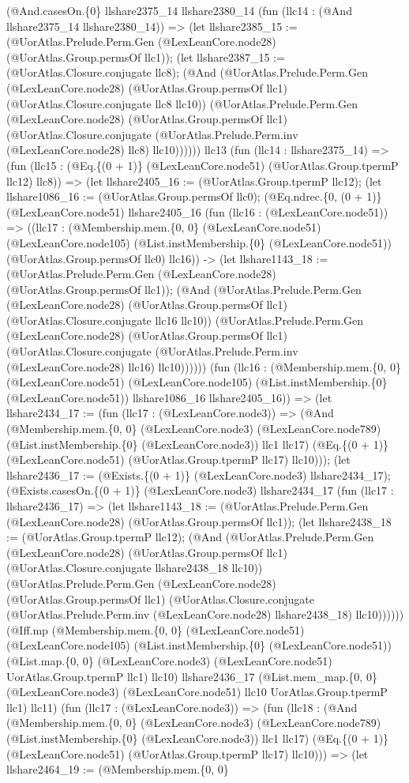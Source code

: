 \documentclass[11pt]{article}
\begin{document}
(@And.casesOn.\{0\} llshare2375\_14 llshare2380\_14 (fun (llc14 : (@And llshare2375\_14 llshare2380\_14)) => (let llshare2385\_15 := (@UorAtlas.Prelude.Perm.Gen (@LexLeanCore.node28) (@UorAtlas.Group.permsOf llc1)); (let llshare2387\_15 := (@UorAtlas.Closure.conjugate llc8); (@And (@UorAtlas.Prelude.Perm.Gen (@LexLeanCore.node28) (@UorAtlas.Group.permsOf llc1) (@UorAtlas.Closure.conjugate llc8 llc10)) (@UorAtlas.Prelude.Perm.Gen (@LexLeanCore.node28) (@UorAtlas.Group.permsOf llc1) (@UorAtlas.Closure.conjugate (@UorAtlas.Prelude.Perm.inv (@LexLeanCore.node28) llc8) llc10)))))) llc13 (fun (llc14 : llshare2375\_14) => (fun (llc15 : (@Eq.\{(0 + 1)\} (@LexLeanCore.node51) (@UorAtlas.Group.tpermP llc12) llc8)) => (let llshare2405\_16 := (@UorAtlas.Group.tpermP llc12); (let llshare1086\_16 := (@UorAtlas.Group.permsOf llc0); (@Eq.ndrec.\{0, (0 + 1)\} (@LexLeanCore.node51) llshare2405\_16 (fun (llc16 : (@LexLeanCore.node51)) => ((llc17 : (@Membership.mem.\{0, 0\} (@LexLeanCore.node51) (@LexLeanCore.node105) (@List.instMembership.\{0\} (@LexLeanCore.node51)) (@UorAtlas.Group.permsOf llc0) llc16)) -> (let llshare1143\_18 := (@UorAtlas.Prelude.Perm.Gen (@LexLeanCore.node28) (@UorAtlas.Group.permsOf llc1)); (@And (@UorAtlas.Prelude.Perm.Gen (@LexLeanCore.node28) (@UorAtlas.Group.permsOf llc1) (@UorAtlas.Closure.conjugate llc16 llc10)) (@UorAtlas.Prelude.Perm.Gen (@LexLeanCore.node28) (@UorAtlas.Group.permsOf llc1) (@UorAtlas.Closure.conjugate (@UorAtlas.Prelude.Perm.inv (@LexLeanCore.node28) llc16) llc10)))))) (fun (llc16 : (@Membership.mem.\{0, 0\} (@LexLeanCore.node51) (@LexLeanCore.node105) (@List.instMembership.\{0\} (@LexLeanCore.node51)) llshare1086\_16 llshare2405\_16)) => (let llshare2434\_17 := (fun (llc17 : (@LexLeanCore.node3)) => (@And (@Membership.mem.\{0, 0\} (@LexLeanCore.node3) (@LexLeanCore.node789) (@List.instMembership.\{0\} (@LexLeanCore.node3)) llc1 llc17) (@Eq.\{(0 + 1)\} (@LexLeanCore.node51) (@UorAtlas.Group.tpermP llc17) llc10))); (let llshare2436\_17 := (@Exists.\{(0 + 1)\} (@LexLeanCore.node3) llshare2434\_17); (@Exists.casesOn.\{(0 + 1)\} (@LexLeanCore.node3) llshare2434\_17 (fun (llc17 : llshare2436\_17) => (let llshare1143\_18 := (@UorAtlas.Prelude.Perm.Gen (@LexLeanCore.node28) (@UorAtlas.Group.permsOf llc1)); (let llshare2438\_18 := (@UorAtlas.Group.tpermP llc12); (@And (@UorAtlas.Prelude.Perm.Gen (@LexLeanCore.node28) (@UorAtlas.Group.permsOf llc1) (@UorAtlas.Closure.conjugate llshare2438\_18 llc10)) (@UorAtlas.Prelude.Perm.Gen (@LexLeanCore.node28) (@UorAtlas.Group.permsOf llc1) (@UorAtlas.Closure.conjugate (@UorAtlas.Prelude.Perm.inv (@LexLeanCore.node28) llshare2438\_18) llc10)))))) (@Iff.mp (@Membership.mem.\{0, 0\} (@LexLeanCore.node51) (@LexLeanCore.node105) (@List.instMembership.\{0\} (@LexLeanCore.node51)) (@List.map.\{0, 0\} (@LexLeanCore.node3) (@LexLeanCore.node51) UorAtlas.Group.tpermP llc1) llc10) llshare2436\_17 (@List.mem\_map.\{0, 0\} (@LexLeanCore.node3) (@LexLeanCore.node51) llc10 UorAtlas.Group.tpermP llc1) llc11) (fun (llc17 : (@LexLeanCore.node3)) => (fun (llc18 : (@And (@Membership.mem.\{0, 0\} (@LexLeanCore.node3) (@LexLeanCore.node789) (@List.instMembership.\{0\} (@LexLeanCore.node3)) llc1 llc17) (@Eq.\{(0 + 1)\} (@LexLeanCore.node51) (@UorAtlas.Group.tpermP llc17) llc10))) => (let llshare2464\_19 := (@Membership.mem.\{0, 0\} 
\end{document}
